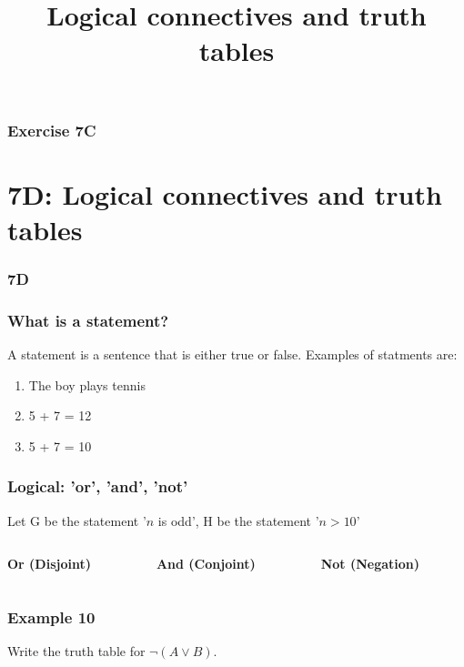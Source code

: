\documentclass[
	11pt, %
]{beamer}
\begin{document}
\begin{frame}
    \frametitle{Exercise 7C}
\end{frame}

\section{7D: Logical connectives and truth tables}
\begin{frame}
    \frametitle{7D}
    \begin{center}
        \title{Logical connectives and truth tables}
        \maketitle
    \end{center}
\end{frame}

\begin{frame}
    \frametitle{What is a statement?}
    A statement is a sentence that is either true or false. Examples of statments are:\\
    \begin{enumerate}
        \item The boy plays tennis
        \item 5 + 7 = 12
        \item 5 + 7 = 10
    \end{enumerate}
\end{frame}

\begin{frame}[t]
    \frametitle{Logical: 'or', 'and', 'not'}
    Let G be the statement '$n$ is odd', H be the statement '$n>10$'
    \begin{columns}
        \begin{column}{0.333\textwidth}
            \textbf{Or (Disjoint)}
        \end{column}
        \begin{column}{0.333\textwidth}
            \textbf{And (Conjoint)}
        \end{column}
        \begin{column}{0.333\textwidth}
            \textbf{Not (Negation)}
        \end{column}
    \end{columns}
\end{frame}

\begin{frame}[t]
    \frametitle{Example 10}
    Write the truth table for $\lnot(A \lor B)$.
\end{frame}
\end{document}
